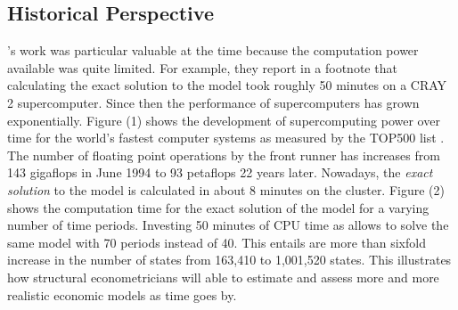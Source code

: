 \subsection*{Historical Perspective}
 \citet{Keane.1994}'s work was particular valuable at the time because the computation power available was quite limited. For example, they report in a footnote that calculating the exact solution to the model took roughly 50 minutes on a CRAY 2 supercomputer. Since then the performance of supercomputers has grown exponentially. Figure (1) shows the development of supercomputing power over time for the world's fastest computer systems as measured by the TOP500 list \citep{TOP500.2017}. The number of floating point operations by the front runner has increases from 143 gigaflops in June 1994 to 93 petaflops 22 years later. Nowadays, the \textit{exact solution} to the model is calculated in about 8 minutes on the  cluster. Figure (2) shows the computation time for the exact solution of the model for a varying number of time periods. Investing 50 minutes of CPU time as allows to solve the same model with 70 periods instead of 40. This entails are more than sixfold increase in the number of states from 163,410 to 1,001,520 states. This illustrates how structural econometricians will able to estimate and assess more and more realistic economic models as time goes by.
